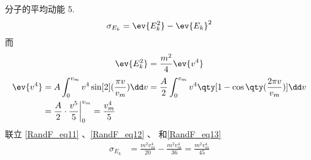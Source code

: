 \begin{example}{分子的平均动能}
5.
\begin{equation}\label{RandF_eq12}
\sigma_{E_k}=\ev{E_k^2}-\ev{E_k}^2
\end{equation}
而
\begin{equation}\label{RandF_eq13}
\ev{E_k^2}=\frac{m^2}{4}\ev{v^4}
\end{equation}
\begin{equation}
\begin{aligned}
\ev{v^4}&=A\int_0^{v_{m}}v^4\sin[2](\frac{\pi v}{v_{m}})\dd v =\frac{A}{2}\int_0^{v_{m}}v^4\qty[1-\cos\qty(\frac{2\pi v}{v_{m}})]\dd v\\
&=\frac{A}{2}\cdot\frac{v^5}{5}\bigg|_0^{v_{m}}=\frac{v_m^4}{5}
\end{aligned}
\end{equation}
联立 \autoref{RandF_eq11}  、\autoref{RandF_eq12} 、 和\autoref{RandF_eq13} 
\begin{equation}
\begin{aligned}
\sigma_{E_k}&=\frac{m^2v_m^4}{20}-\frac{m^2v_m^4}{36}=\frac{m^2v_m^4}{45}
\end{aligned}
\end{equation}
\end{example}

